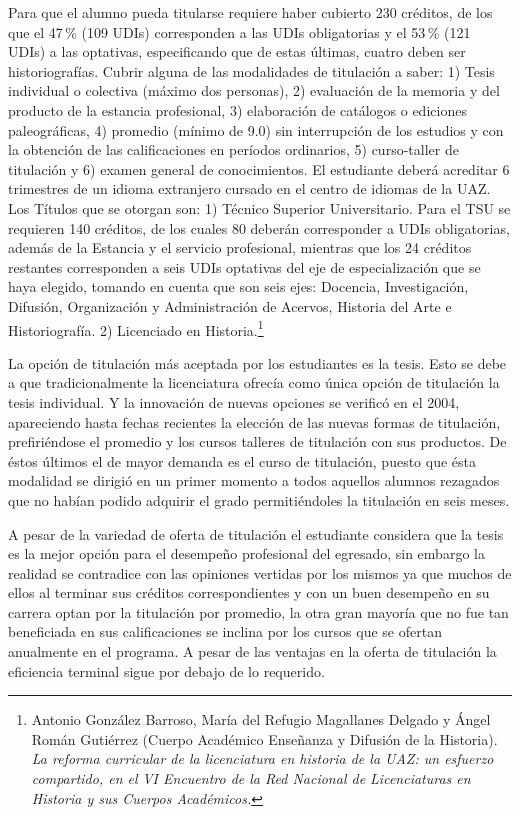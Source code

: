 Para que el alumno pueda titularse requiere haber cubierto 230 créditos, de
los que el 47\,\% (109 UDIs) corresponden a las UDIs obligatorias y el 53\,\%
(121 UDIs) a las optativas, especificando que de estas últimas, cuatro
deben ser historiografías.  Cubrir alguna de las modalidades de titulación
a saber: 1) Tesis individual o colectiva (máximo dos personas), 2)
evaluación de la memoria y del producto de la estancia profesional, 3)
elaboración de catálogos o ediciones paleográficas, 4) promedio (mínimo de
9.0) sin interrupción de los estudios y con la obtención de las
calificaciones en períodos ordinarios, 5) curso-taller de titulación y 6)
examen general de conocimientos.  El estudiante deberá acreditar 6
trimestres de un idioma extranjero cursado en el centro de idiomas de la
UAZ.  Los Títulos que se otorgan son: 1) Técnico Superior Universitario. 
Para el TSU se requieren 140 créditos, de los cuales 80 deberán
corresponder a UDIs obligatorias, además de la Estancia y el servicio
profesional, mientras que los 24 créditos restantes corresponden a seis
UDIs optativas del eje  de especialización que se haya elegido, tomando en
cuenta que son seis ejes: Docencia, Investigación, Difusión, Organización y
Administración de Acervos, Historia del Arte e Historiografía.  2)
Licenciado en Historia.\footnote{Antonio
González Barroso, María del Refugio Magallanes Delgado y Ángel Román
Gutiérrez (Cuerpo Académico Enseñanza y Difusión de la Historia).
\textit{La reforma curricular de la licenciatura en historia de la UAZ: un
esfuerzo compartido, en el }\textit{VI Encuentro de la Red Nacional de
Licenciaturas en Historia y sus Cuerpos Académicos.}}  

La opción de titulación más aceptada por los estudiantes es la tesis. 
Esto se debe a que tradicionalmente la licenciatura ofrecía como única 
opción de titulación la tesis individual. Y la innovación de nuevas 
opciones se verificó en el 2004, apareciendo hasta fechas recientes la 
elección de las nuevas formas de titulación, prefiriéndose el promedio  
y los cursos talleres de titulación con sus productos. De éstos últimos 
el de mayor demanda es el curso de titulación, puesto que ésta 
modalidad se dirigió en un primer momento a todos aquellos alumnos 
rezagados que no habían podido adquirir el grado permitiéndoles la 
titulación en seis meses.

A pesar de la variedad de oferta de titulación el estudiante considera 
que la tesis es la mejor opción para el desempeño profesional del 
egresado, sin embargo la realidad se contradice con las opiniones 
vertidas por los mismos ya que muchos de ellos al terminar sus créditos 
correspondientes y con un buen desempeño en su carrera optan por la 
titulación por promedio, la otra gran mayoría que no fue tan 
beneficiada en sus calificaciones se inclina por los cursos que se 
ofertan anualmente en el programa. A pesar de las ventajas en la oferta 
de titulación  la eficiencia terminal sigue por debajo de lo requerido. 

